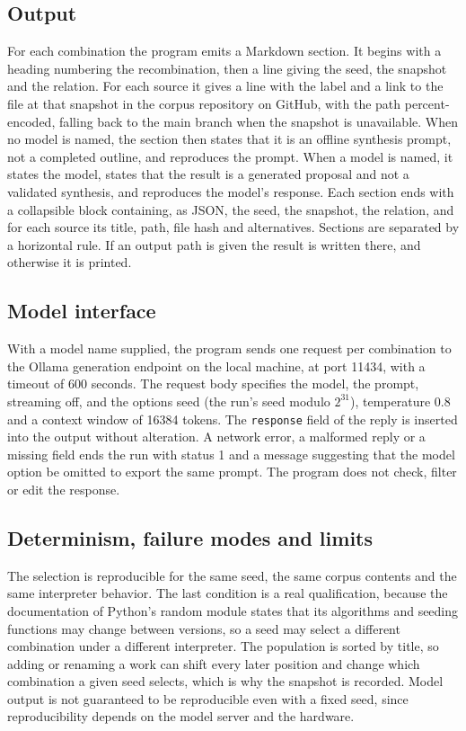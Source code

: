 \documentclass[11pt]{article}
\begin{document}
\subsection{Output}

For each combination the program emits a Markdown section. It begins with a heading numbering the recombination, then a line giving the seed, the snapshot and the relation. For each source it gives a line with the label and a link to the file at that snapshot in the corpus repository on GitHub, with the path percent-encoded, falling back to the main branch when the snapshot is unavailable. When no model is named, the section then states that it is an offline synthesis prompt, not a completed outline, and reproduces the prompt. When a model is named, it states the model, states that the result is a generated proposal and not a validated synthesis, and reproduces the model's response. Each section ends with a collapsible block containing, as JSON, the seed, the snapshot, the relation, and for each source its title, path, file hash and alternatives. Sections are separated by a horizontal rule. If an output path is given the result is written there, and otherwise it is printed.

\subsection{Model interface}

With a model name supplied, the program sends one request per combination to the Ollama generation endpoint on the local machine, at port 11434, with a timeout of 600 seconds. The request body specifies the model, the prompt, streaming off, and the options seed (the run's seed modulo $2^{31}$), temperature 0.8 and a context window of 16384 tokens. The \texttt{response} field of the reply is inserted into the output without alteration. A network error, a malformed reply or a missing field ends the run with status 1 and a message suggesting that the model option be omitted to export the same prompt. The program does not check, filter or edit the response.

\subsection{Determinism, failure modes and limits}

The selection is reproducible for the same seed, the same corpus contents and the same interpreter behavior. The last condition is a real qualification, because the documentation of Python's random module states that its algorithms and seeding functions may change between versions, so a seed may select a different combination under a different interpreter. The population is sorted by title, so adding or renaming a work can shift every later position and change which combination a given seed selects, which is why the snapshot is recorded. Model output is not guaranteed to be reproducible even with a fixed seed, since reproducibility depends on the model server and the hardware.
\end{document}
